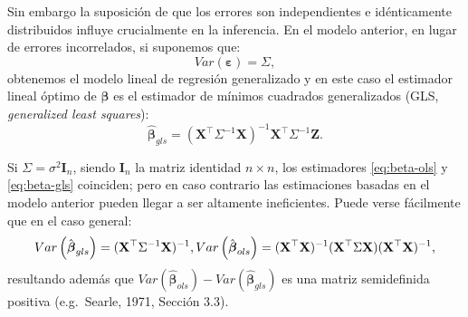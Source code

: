 \documentclass[
  spanish,
]{book}
\theoremstyle{break}
\begin{document}
Sin embargo la suposición de que los errores son independientes e idénticamente distribuidos influye crucialmente en la inferencia.
En el modelo anterior, en lugar de errores incorrelados, si suponemos que:
\[Var\left( \boldsymbol{\varepsilon} \right) =\Sigma,\]
obtenemos el modelo lineal de regresión generalizado y en este caso el estimador lineal óptimo de \(\boldsymbol{\beta}\) es el estimador de mínimos cuadrados generalizados (GLS, \emph{generalized least squares}):
\begin{equation} 
  \hat{\boldsymbol{\beta}}_{gls} =(\mathbf{X}^{\top}\Sigma^{-1} \mathbf{X})^{-1} \mathbf{X}^{\top}\Sigma^{-1} \mathbf{Z}.
  \label{eq:beta-gls}
\end{equation}

Si \(\Sigma=\sigma^{2} \mathbf{I}_{n}\), siendo \(\mathbf{I}_{n}\) la matriz identidad \(n\times n\), los estimadores \eqref{eq:beta-ols} y \eqref{eq:beta-gls} coinciden; pero en caso contrario las estimaciones basadas en el modelo anterior pueden llegar a ser altamente ineficientes.
Puede verse fácilmente que en el caso general:
\[Var\left( \hat{\boldsymbol{\beta}}_{gls} \right)=(\mathbf{X}^{\top}\Sigma^{-1} \mathbf{X})^{-1}, \\
Var\left( \hat{\boldsymbol{\beta}}_{ols} \right) =(\mathbf{X}^{\top}\mathbf{X})^{-1} (\mathbf{X}^{\top}\Sigma\mathbf{X})(\mathbf{X}^{\top}\mathbf{X})^{-1},\]
resultando además que \(Var( \hat{\boldsymbol{\beta}}_{ols}) - Var( \hat{\boldsymbol{\beta}}_{gls} )\) es una matriz semidefinida positiva (e.g.~Searle, 1971, Sección 3.3).
\end{document}

